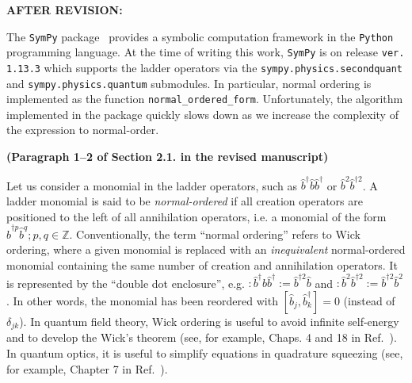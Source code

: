 \documentclass[12pt, a4paper]{article}
\newcommand{\inlinecode}[1]{\texttt{#1}}
\newcommand{\comm}[2]{\left[{#1},{#2}\right]}
\newcommand{\bop}{\hat{b}}
\newcommand{\bdag}{\bop^\dagger}
\newcommand{\bdagn}[1]{\bop^{\dagger {#1}}}
\newenvironment{revision}{%
\color{red}
}
{}
\newenvironment{revpost}{%
\textbf{{AFTER REVISION:}}
\par
}
{}
\begin{document}
\begin{revpost}
The \texttt{SymPy} package~\cite{meurer_sympy_2017} provides a symbolic computation framework in the \texttt{Python} programming language. At the time of writing this work, \texttt{SymPy} is on release \inlinecode{ver. 1.13.3} which supports the ladder operators via the \inlinecode{sympy.physics.secondquant} and \inlinecode{sympy.physics.quantum} submodules. In particular, normal ordering is implemented as the function \inlinecode{normal_ordered_form}. Unfortunately, the algorithm implemented in the package quickly slows down as we increase the complexity of the expression to normal-order.

\textbf{(Paragraph 1--2 of Section 2.1. in the revised manuscript)}

\begin{revision}Let us consider a monomial in the ladder operators, such as $\bdag\bop\bdag$ or $\bop^2\bdagn{2}$. A ladder monomial is said to be \emph{normal-ordered} if all creation operators are positioned to the left of all annihilation operators, i.e. a monomial of the form $\bdagn{p}\bop^q; p,q\in\mathbb{Z}$. Conventionally, the term ``normal ordering'' refers to Wick ordering, where a given monomial is replaced with an \emph{inequivalent} normal-ordered monomial containing the same number of creation and annihilation operators. It is represented by the ``double dot enclosure'', e.g. $:\mathrel{\bdag\bop\bdag}:=\bdagn{2}\bop$ and $:\mathrel{\bop^2\bdagn{2}}:=\bdagn{2}\bop^2$. In other words, the monomial has been reordered with $\comm{\bop_j}{\bdag_k}=0$ (instead of $\delta_{jk}$). In quantum field theory, Wick ordering is useful to avoid infinite self-energy and to develop the Wick's theorem (see, for example, Chaps. 4 and 18 in Ref.~\cite{lancaster_quantum_2014}). In quantum optics, it is useful to simplify equations in quadrature squeezing (see, for example, Chapter 7 in Ref.~\cite{gerry_introductory_2005}).


\end{revision}
\end{revpost}
\end{document}
